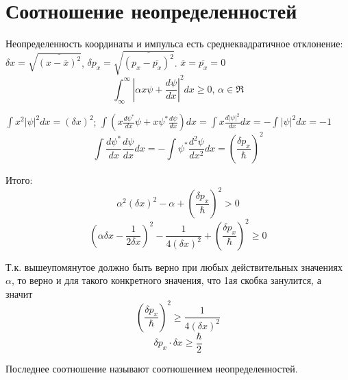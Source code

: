 \newpage
\chapter{Соотношение неопределенностей}
\par Неопределенность координаты и импульса есть среднеквадратичное отклонение: $\delta x = \sqrt{\overline{(x-\overline{x})^2}}$, $\delta p_x = \sqrt{\overline{(p_x-\overline{p_x})^2}}$.  $\overline{x}=\overline{p_x}=0$
$$\int^\infty_\infty |\alpha x \psi + \frac{d\psi}{dx}|^2 dx \geq 0 \text{, }\alpha \in \Re $$
\par $\int x^2|\psi|^2dx=(\delta x)^2$; $\int (x \frac{d\psi^*}{dx}\psi + x \psi^* \frac{d\psi}{dx})dx = \int x \frac{d|\psi|^2}{dx}dx= - \int |\psi|^2 dx = -1$
$$\int \frac{d\psi^*}{dx} \frac{d\psi}{dx}dx = - \int \psi^* \frac{d^2 \psi}{dx^2} dx = (\frac{\delta p_x}{\hbar})^2$$
\par Итого:
$$\alpha^2(\delta x)^2 - \alpha + (\frac{\delta p_x}{\hbar})^2 > 0$$
$$(\alpha \delta x -\frac{1}{2\delta x})^2 - \frac{1}{4(\delta x)^2} + (\frac{\delta p_x}{\hbar})^2 \geq 0$$
\par Т.к. вышеупомянутое должно быть верно при любых действительных значениях $\alpha$, то верно и для такого конкретного значения, что 1ая скобка занулится, а значит
$$(\frac{\delta p_x}{\hbar})^2 \geq \frac{1}{4(\delta x)^2} $$
$$ \delta p_x \cdot \delta x \geq \frac{\hbar}{2}$$
\par Последнее соотношение называют соотношением неопределенностей.

